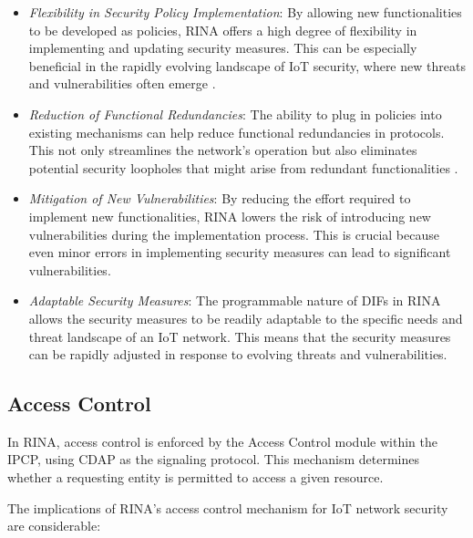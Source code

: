 \documentclass{ieeeaccess}
\begin{document}
\begin{itemize}
	\item \textit{Flexibility in Security Policy Implementation}: By allowing new functionalities to be developed as policies, RINA offers a high degree of flexibility in implementing and updating security measures. This can be especially beneficial in the rapidly evolving landscape of IoT security, where new threats and vulnerabilities often emerge \cite{s20133622}.
	\item \textit{Reduction of Functional Redundancies}: The ability to plug in policies into existing mechanisms can help reduce functional redundancies in protocols. This not only streamlines the network's operation but also eliminates potential security loopholes that might arise from redundant functionalities \cite{en14102818}.
	\item \textit{Mitigation of New Vulnerabilities}: By reducing the effort required to implement new functionalities, RINA lowers the risk of introducing new vulnerabilities during the implementation process. This is crucial because even minor errors in implementing security measures can lead to significant vulnerabilities.	
	\item \textit{Adaptable Security Measures}: The programmable nature of DIFs in RINA allows the security measures to be readily adaptable to the specific needs and threat landscape of an IoT network. This means that the security measures can be rapidly adjusted in response to evolving threats and vulnerabilities.
\end{itemize}

\subsection{Access Control}
In RINA, access control is enforced by the Access Control module within the IPCP, using CDAP as the signaling protocol. This mechanism determines whether a requesting entity is permitted to access a given resource.

The implications of RINA's access control mechanism for IoT network security are considerable:
\end{document}
